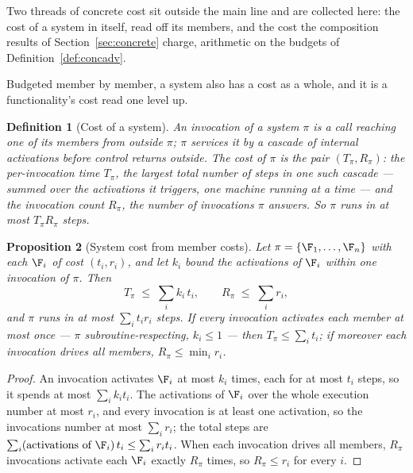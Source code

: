 \documentclass[10pt,oneside,openany]{book}
\theoremstyle{accentdef}
\newtheorem{definition}{Definition}[chapter]
\theoremstyle{accentplain}
\newtheorem{proposition}[definition]{Proposition}
\begin{document}
Two threads of concrete cost sit outside the main line and are collected here: the cost of a
system in itself, read off its members, and the cost the composition results of
Section~\ref{sec:concrete} charge, arithmetic on the budgets of Definition~\ref{def:concadv}.

Budgeted member by member, a system also has a cost as a whole, and it is a functionality's cost
read one level up.

\begin{definition}[Cost of a system]\label{def:syscost}
An \emph{invocation} of a system $\pi$ is a call reaching one of its members from outside $\pi$;
$\pi$ services it by a cascade of internal activations before control returns outside. The
\emph{cost} of $\pi$ is the pair $(T_\pi, R_\pi)$: the \emph{per-invocation time} $T_\pi$, the
largest total number of steps in one such cascade --- summed over the activations it triggers,
one machine running at a time --- and the \emph{invocation count} $R_\pi$, the number of
invocations $\pi$ answers. So $\pi$ runs in at most $T_\pi R_\pi$ steps.
\end{definition}

\begin{proposition}[System cost from member costs]\label{prop:syscost}
Let $\pi = \{\F_1,\dots,\F_n\}$ with each $\F_i$ of cost $(t_i, r_i)$, and let $k_i$ bound the
activations of $\F_i$ within one invocation of $\pi$. Then
\[
  T_\pi \;\le\; \sum_{i} k_i\, t_i , \qquad R_\pi \;\le\; \sum_{i} r_i ,
\]
and $\pi$ runs in at most $\sum_i t_i r_i$ steps. If every invocation activates each member at most
once --- $\pi$ subroutine-respecting, $k_i \le 1$ --- then $T_\pi \le \sum_i t_i$; if moreover each
invocation drives all members, $R_\pi \le \min_i r_i$.
\end{proposition}

\begin{proof}
An invocation activates $\F_i$ at most $k_i$ times, each for at most $t_i$ steps, so it spends at
most $\sum_i k_i t_i$. The activations of $\F_i$ over the whole execution number at most $r_i$, and
every invocation is at least one activation, so the invocations number at most $\sum_i r_i$; the
total steps are $\sum_i (\text{activations of }\F_i)\, t_i \le \sum_i r_i t_i$. When each
invocation drives all members, $R_\pi$ invocations activate each $\F_i$ exactly $R_\pi$ times, so
$R_\pi \le r_i$ for every $i$.
\end{proof}
\end{document}
